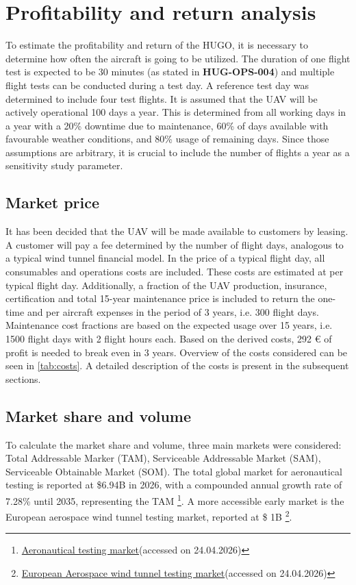 \chapter{Profitability and return analysis}
\label{ch: Profitability}
To estimate the profitability and return of the HUGO, it is necessary to determine how often the aircraft is going to be utilized. The duration of one flight test is expected to be 30 minutes (as stated in \textbf{HUG-OPS-004}) and multiple flight tests can be conducted during a test day. A reference test day was determined to include four test flights. It is assumed that the UAV will be actively operational 100 days a year. This is determined from all working days in a year with a 20\% downtime due to maintenance, 60\% of days available with favourable weather conditions, and 80\% usage of remaining days. Since those assumptions are arbitrary, it is crucial to include the number of flights a year as a sensitivity study parameter.
\section{Market price}
It has been decided that the UAV will be made available to customers by leasing. A customer will pay a fee determined by the number of flight days, analogous to a typical wind tunnel financial model. In the price of a typical flight day, all consumables and operations costs are included. These costs are estimated at  per typical flight day. Additionally, a fraction of the UAV production, insurance, certification and total 15-year maintenance price is included to return the one-time and per aircraft expenses in the period of 3 years, i.e. 300 flight days. Maintenance cost fractions are based on the expected usage over 15 years, i.e. 1500 flight days with 2 flight hours each. Based on the derived costs, 292 € of profit is needed to break even in 3 years. Overview of the costs considered can be seen in \autoref{tab:costs}. A detailed description of the costs is present in the subsequent sections.

\section{Market share and volume} 
To calculate the market share and volume, three main markets were considered: Total Addressable Marker (TAM), Serviceable Addressable Market (SAM), Serviceable Obtainable Market (SOM). The total global market for aeronautical testing is reported at \$6.94B in 2026, with a compounded annual growth rate of 7.28\% until 2035, representing the TAM \footnote{\href{https://www.businessresearchinsights.com/market-reports/aeronautical-tester-market-105709}{Aeronautical testing market}(accessed on 24.04.2026)}. A more accessible early market is the European aerospace wind tunnel testing market, reported at \$ 1B \footnote{\href{https://www.prophecymarketinsights.com/market_insight/europe-wind-tunnel-market-5840}{European Aerospace wind tunnel testing market}(accessed on 24.04.2026)}. 

